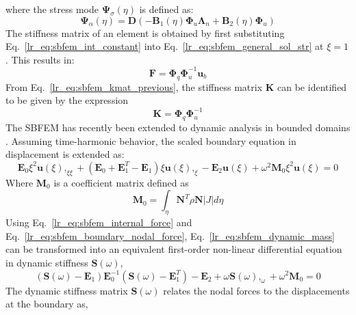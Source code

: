 %
where the stress mode $\mathbf{\Psi}_\sigma(\eta)$ is defined as:
\begin{equation}
    \mathbf{\Psi}_\alpha(\eta) =    \mathbf{D}(
                                       -\mathbf{B}_1(\eta) \mathbf{\Phi}_u \mathbf{\Lambda}_n +
                                        \mathbf{B}_2(\eta) \mathbf{\Phi}_u
                                    )
    \label{lr_eq:sbfem_stress_mode}
\end{equation}
%
The stiffness matrix of an element is obtained by first substituting Eq.~\ref{lr_eq:sbfem_int_constant} into Eq.~\ref{lr_eq:sbfem_general_sol_str} at $\xi=1$.
This results in:
\begin{equation}
    \mathbf{F} = \mathbf{\Phi}_q \mathbf{\Phi}_u^{-1} \mathbf{u}_b
    \label{lr_eq:sbfem_kmat_previous}
\end{equation}
%
From Eq.~\ref{lr_eq:sbfem_kmat_previous}, the stiffness matrix $\mathbf{K}$ can be identified to be given by the expression
\begin{equation}
    \mathbf{K} = \mathbf{\Phi}_q \mathbf{\Phi}_u^{-1}
    \label{lr_eq:sbfem_kmat}
\end{equation}
%
The SBFEM has recently been extended to dynamic analysis in bounded domains \citep{Song2009}.
Assuming time-harmonic behavior, the scaled boundary equation in displacement is extended as:
\begin{equation}
    \mathbf{E}_0 \xi^2 \mathbf{u}(\xi),_{\xi\xi} +
    (\mathbf{E}_0 + \mathbf{E}_1^T - \mathbf{E}_1)\xi \mathbf{u}(\xi),_{\xi} -
    \mathbf{E}_2 \mathbf{u}(\xi) + \omega^2 \mathbf{M}_0 \xi^2 \mathbf{u}(\xi) = 0
    \label{lr_eq:sbfem_dynamic}
\end{equation}
%
Where $\mathbf{M}_0$ is a coefficient matrix defined as
\begin{equation}
    \mathbf{M}_0 = \int_\eta \mathbf{N}^T \rho \mathbf{N}|J| d\eta
    \label{lr_eq:sbfem_dynamic_mass}
\end{equation}
%
Using Eq.~\ref{lr_eq:sbfem_internal_force} and Eq.~\ref{lr_eq:sbfem_boundary_nodal_force}, Eq.~\ref{lr_eq:sbfem_dynamic_mass} can be transformed into an equivalent first-order non-linear differential equation in dynamic stiffness $\mathbf{S}(\omega)$,
\begin{equation}
    (\mathbf{S}(\omega)-\mathbf{E}_1)\mathbf{E}_0^{-1}
    (\mathbf{S}(\omega)-\mathbf{E}_1^T) - \mathbf{E}_2 +
    \omega \mathbf{S}(\omega),_\omega + \omega^2 \mathbf{M}_0 = 0
    \label{lr_eq:sbfem_dynamic_1stODE}
\end{equation}
%
The dynamic stiffness matrix $\mathbf{S}(\omega)$ relates the nodal forces to the displacements at the boundary as,
